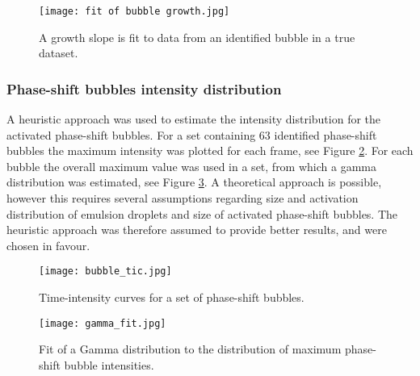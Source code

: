 \begin{figure}[h]
  \centering
  \texttt{[image: fit of bubble growth.jpg]}
  \caption{A growth slope is fit to data from an identified bubble in a true dataset.}
  \label{Fig:growth slope}
\end{figure}


\subsubsection{Phase-shift bubbles intensity distribution}
\label{PS intensity distribution}
A heuristic approach was used to estimate the intensity distribution for the activated phase-shift bubbles. For a set containing 63 identified phase-shift bubbles the maximum intensity was plotted for each frame, see Figure \ref{Fig:bubble_tic}. For each bubble the overall maximum value was used in a set, from which a gamma distribution was estimated, see Figure \ref{Fig:gamma_fit}. A theoretical approach is possible, however this requires several assumptions regarding size and activation distribution of emulsion droplets and size of activated phase-shift bubbles.  The heuristic approach was therefore assumed to provide better results, and were chosen in favour. 


\begin{figure}[h]
  \centering
  \texttt{[image: bubble\_tic.jpg]}
  \caption{Time-intensity curves for a set of phase-shift bubbles.}
  \label{Fig:bubble_tic}
\end{figure}
\begin{figure}[h]
  \centering
  \texttt{[image: gamma\_fit.jpg]}
  \caption{Fit of a Gamma distribution to the distribution of maximum phase-shift bubble intensities.}
  \label{Fig:gamma_fit}
\end{figure}


